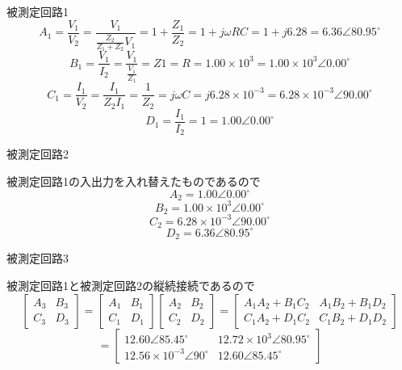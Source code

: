     \begin{description}
        \item 被測定回路1
        $$
        A_1=\frac{V_1}{V_2}=\frac{V_1}{\frac{Z_2}{Z_1+Z_2}V_1}=1+\frac{Z_1}{Z_2}=1+j\omega RC=1+j6.28=6.36\angle80.95^\circ
        $$
        $$
        B_1=\frac{V_1}{I_2}=\frac{V_1}{\frac{V_1}{Z_1}}=Z1=R=1.00\times10^3=1.00\times10^3\angle0.00^\circ
        $$
        $$
        C_1=\frac{I_1}{V_2}=\frac{I_1}{Z_2I_1}=\frac{1}{Z_2}=j\omega C=j6.28\times10^{-3}=6.28\times10^{-3}\angle90.00^\circ
        $$
        $$
        D_1=\frac{I_1}{I_2}=1=1.00\angle0.00^\circ
        $$
        \item 被測定回路2
        
        被測定回路1の入出力を入れ替えたものであるので
        $$
        A_2=1.00\angle0.00^\circ
        $$
        $$
        B_2=1.00\times10^3\angle0.00^\circ
        $$
        $$
        C_2=6.28\times10^{-3}\angle90.00^\circ
        $$
        $$
        D_2=6.36\angle80.95^\circ
        $$
        \item 被測定回路3
        
        被測定回路1と被測定回路2の縦続接続であるので
        $$
        \left[\begin{array}{ll}
        A_3 & B_3 \\
        C_3 & D_3
        \end{array}\right]=\left[\begin{array}{ll}
        A_1 & B_1 \\
        C_1 & D_1
        \end{array}\right]\left[\begin{array}{ll}
        A_2 & B_2 \\
        C_2 & D_2
        \end{array}\right]=\left[\begin{array}{ll}
        A_1A_2+B_1C_2 & A_1B_2+B_1D_2 \\
        C_1A_2+D_1C_2 & C_1B_2+D_1D_2
        \end{array}\right]
        $$
        $$
        =\left[\begin{array}{ll}
        12.60\angle85.45^\circ & 12.72\times10^3\angle80.95^\circ \\
        12.56\times10^{-3}\angle90^\circ & 12.60\angle85.45^\circ
        \end{array}\right]
        $$
    \end{description}



\newpage



